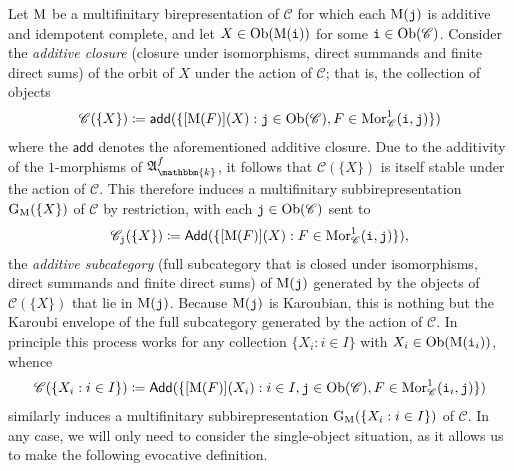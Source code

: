 \noindent Let $\textup{M}$ be a multifinitary birepresentation of $\mathscr{C}$ for which each $\textup{M}(\textup{\texttt{j}})$ is additive and idempotent complete, and let $X \in \textup{Ob}(\textup{M}(\textup{\texttt{i}}))$ for some $\textup{\texttt{i}} \in \textup{Ob}(\mathscr{C})$. Consider the {\em additive closure} (closure under isomorphisms, direct summands and finite direct sums) of the orbit of $X$ under the action of $\mathscr{C}$; that is, the collection of objects
\begin{align*}
\begin{split}
\mathscr{C}(\{X\}) \coloneqq \textsf{add}(\{[\textup{M}(F)](X) : \textup{\texttt{j}} \in \textup{Ob}(\mathscr{C}), F \in \textup{Mor}_\mathscr{C}^1(\textup{\texttt{i}}, \textup{\texttt{j}})\})
\end{split}
\end{align*}
\noindent where the $\textsf{add}$ denotes the aforementioned additive closure. Due to the additivity of the $1$-morphisms of $\mathfrak{A}_\mathbbm{k}^f$, it follows that $\mathscr{C}(\{X\})$ is itself stable under the action of $\mathscr{C}$. This therefore induces a multifinitary subbirepresentation $\textup{G}_\textup{M}(\{X\})$ of $\mathscr{C}$ by restriction, with each $\textup{\texttt{j}} \in \textup{Ob}(\mathscr{C})$ sent to
\begin{align*}
\begin{split}
\mathscr{C}_{\textup{\texttt{j}}}(\{X\}) \coloneqq \textsf{Add}(\{[\textup{M}(F)](X) : F \in \textup{Mor}_\mathscr{C}^1(\textup{\texttt{i}}, \textup{\texttt{j}})\}),
\end{split}
\end{align*}
\noindent the {\em additive subcategory} (full subcategory that is closed under isomorphisms, direct summands and finite direct sums) of $\textup{M}(\textup{\texttt{j}})$ generated by the objects of $\mathscr{C}(\{X\})$ that lie in $\textup{M}(\textup{\texttt{j}})$. Because $\textup{M}(\textup{\texttt{j}})$ is Karoubian, this is nothing but the Karoubi envelope of the full subcategory generated by the action of $\mathscr{C}$. In principle this process works for any collection $\{X_i : i \in I\}$ with $X_i \in \textup{Ob}(\textup{M}(\textup{\texttt{i}}_i))$, whence
\begin{align*}
\begin{split}
\mathscr{C}(\{X_i : i \in I\}) \coloneqq \textsf{Add}(\{[\textup{M}(F)](X_i) : i \in I, \textup{\texttt{j}} \in \textup{Ob}(\mathscr{C}), F \in \textup{Mor}_\mathscr{C}^1(\textup{\texttt{i}}_i, \textup{\texttt{j}})\})
\end{split}
\end{align*}
\noindent similarly induces a multifinitary subbirepresentation $\textup{G}_\textup{M}(\{X_i : i \in I\})$ of $\mathscr{C}$. In any case, we will only need to consider the single-object situation, as it allows us to make the following evocative definition.\\

